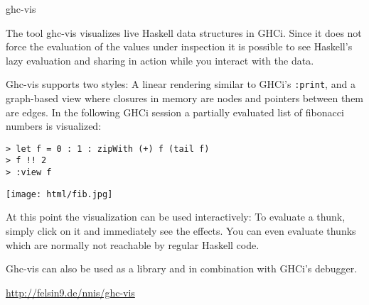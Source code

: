 \begin{hcarentry}{ghc-vis}
\label{ghc-vis}
\makeheader

The tool ghc-vis visualizes live Haskell data structures in GHCi.
Since it does not force the evaluation of the values under inspection it is possible to see Haskell's lazy evaluation and sharing in action while you interact with the data.

Ghc-vis supports two styles: A linear rendering similar to GHCi's \texttt{:print}, and a graph-based view where closures in memory are nodes and pointers between them are edges.
In the following GHCi session a partially evaluated list of fibonacci numbers is visualized:

\begin{verbatim}
> let f = 0 : 1 : zipWith (+) f (tail f)
> f !! 2
> :view f
\end{verbatim}

\begin{center}
\texttt{[image: html/fib.jpg]}
\end{center}

At this point the visualization can be used interactively: To evaluate a thunk, simply click on it and immediately see the effects. You can even evaluate thunks which are normally not reachable by regular Haskell code.

Ghc-vis can also be used as a library and in combination with GHCi's debugger.

\FurtherReading
  \url{http://felsin9.de/nnis/ghc-vis}
\end{hcarentry}
